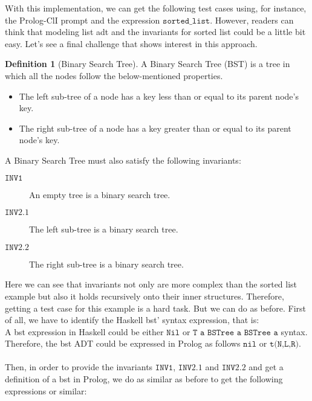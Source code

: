 \documentclass{report}
\theoremstyle{definition}
\theoremstyle{definition}
\newtheorem*{definition*}{Definition}
\begin{document}
With this implementation, we can get the following test cases using, for instance, the Prolog-ClI prompt and the expression $\texttt{sorted\_list}$.
However, readers can think that modeling list adt and the invariants for sorted list could be a little bit easy. Let's see a final challenge that shows interest in this approach.
\begin{definition*}[Binary Search Tree]
	A Binary Search Tree (BST) is a tree in which all the nodes follow the below-mentioned properties.
	\begin{itemize}
		\item The left sub-tree of a node has a key less than or equal to its parent node's key.
		\item The right sub-tree of a node has a key greater than or equal to its parent node's key.
	\end{itemize}
	A Binary Search Tree must also satisfy the following invariants:
	\begin{description}
		\item[$\mathtt{INV1}$] An empty tree is a binary search tree.
		\item[$\mathtt{INV2.1}$] The left sub-tree is a binary search tree.
		\item[$\mathtt{INV2.2}$] The right sub-tree is a binary search tree.
	\end{description}
\end{definition*}
Here we can see that invariants not only are more complex than the sorted list example but also it holds recursively onto their inner structures. Therefore, getting a test case for this example is a hard task. But we can do as before. First of all, we have to identify the Haskell bst' syntax expression, that is:\\
A bst expression in Haskell could be either $\texttt{Nil}$ or $\texttt{T a BSTree a BSTree a}$ syntax.
Therefore, the bst ADT could be expressed in Prolog as follows $\texttt{nil}$ or $\texttt{t(N,L,R)}$.\\\\
Then, in order to provide the invariants $\mathtt{INV1}$, $\mathtt{INV2.1}$ and $\mathtt{INV2.2}$ and get a definition of a bst in Prolog, we do as similar as before to get the following expressions or similar:
\end{document}
